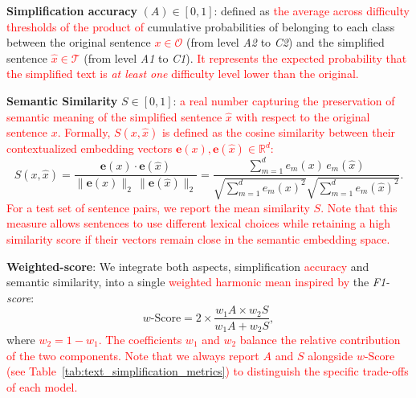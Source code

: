 \textbf{Simplification accuracy} $(A) \in [0, 1]$: defined as \textcolor{red}{the average across difficulty thresholds of the product of} cumulative probabilities of belonging to each class between the original sentence \textcolor{red}{$x \in \mathcal{O}$} (from level \textit{A2} to \textit{C2}) and the simplified sentence \textcolor{red}{$\hat{x} \in \mathcal{T}$} (from level \textit{A1} to \textit{C1}). \textcolor{red}{It represents the expected probability that the simplified text is \textit{at least one} difficulty level lower than the original.}

\textbf{Semantic Similarity} $S \in [0, 1]$: \textcolor{red}{a real number capturing the preservation of semantic meaning of the simplified sentence $\hat{x}$ with respect to the original sentence $x$. Formally, $S(x, \hat{x})$ is defined as the cosine similarity between their contextualized embedding vectors $\mathbf{e}(x), \mathbf{e}(\hat{x}) \in \mathbb{R}^d$:}
{\color{red}\begin{equation}
    S(x, \hat{x}) = \frac{\mathbf{e}(x) \cdot \mathbf{e}(\hat{x})}{\|\mathbf{e}(x)\|_2 \, \|\mathbf{e}(\hat{x})\|_2} = \frac{\sum_{m=1}^{d} e_m(x)\, e_m(\hat{x})}{\sqrt{\sum_{m=1}^{d} e_m(x)^2} \sqrt{\sum_{m=1}^{d} e_m(\hat{x})^2}}.
    \label{eq:semantic_similarity}
\end{equation}}
\textcolor{red}{For a test set of sentence pairs, we report the mean similarity $S$. Note that this measure allows sentences to use different lexical choices while retaining a high similarity score if their vectors remain close in the semantic embedding space.}

\textbf{Weighted-score}: We integrate both aspects, simplification \textcolor{red}{accuracy} and semantic similarity, into a single \textcolor{red}{weighted harmonic mean inspired by} the \textit{F1-score}:
{\color{red}\begin{equation}
    w\text{-Score} = 2 \times \frac{w_1 A \times w_2 S}{w_1 A + w_2 S},
    \label{eq:w_score}
\end{equation}}
where \textcolor{red}{$w_2 = 1 - w_1$. The coefficients $w_1$ and $w_2$ balance the relative contribution of the two components. Note that we always report $A$ and $S$ alongside $w\text{-Score}$ (see Table~\ref{tab:text_simplification_metrics}) to distinguish the specific trade-offs of each model.}

